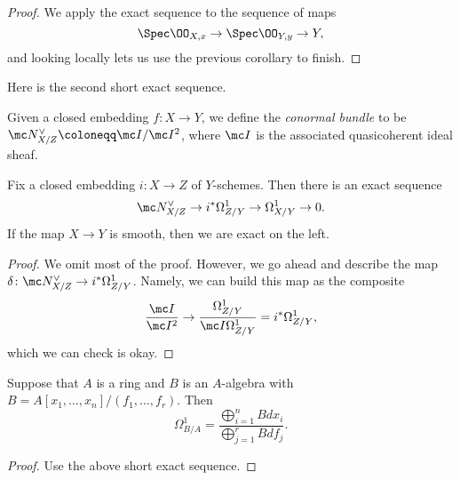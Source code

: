 \documentclass[../notes.tex]{subfiles}
\begin{document}
\begin{proof}
	We apply the exact sequence to the sequence of maps
	\[\Spec\OO_{X,x}\to\Spec\OO_{Y,y}\to Y,\]
	and looking locally lets us use the previous corollary to finish.
\end{proof}
Here is the second short exact sequence.
\begin{definition}
	Given a closed embedding $f\colon X\to Y$, we define the \textit{conormal bundle} to be $\mc N_{X/Z}^\lor\coloneqq\mc I/\mc I^2$, where $\mc I$ is the associated quasicoherent ideal sheaf.
\end{definition}
\begin{proposition}
	Fix a closed embedding $i\colon X\to Z$ of $Y$-schemes. Then there is an exact sequence
	\[\mc N_{X/Z}^\lor\to i^*\Omega^1_{Z/Y}\to\Omega^1_{X/Y}\to0.\]
	If the map $X\to Y$ is smooth, then we are exact on the left.
\end{proposition}
\begin{proof}
	We omit most of the proof. However, we go ahead and describe the map $\delta\colon\mc N_{X/Z}^\lor\to i^*\Omega^1_{Z/Y}$. Namely, we can build this map as the composite
	\[\frac{\mc I}{\mc I^2}\to\frac{\Omega^1_{Z/Y}}{\mc I\Omega^1_{Z/Y}}=i^*\Omega^1_{Z/Y},\]
	which we can check is okay.
\end{proof}
\begin{corollary}
	Suppose that $A$ is a ring and $B$ is an $A$-algebra with $B=A[x_1,\ldots,x_n]/(f_1,\ldots,f_r)$. Then
	\[\Omega^1_{B/A}=\frac{\bigoplus_{i=1}^nBdx_i}{\bigoplus_{j=1}^rBdf_j}.\]
\end{corollary}
\begin{proof}
	Use the above short exact sequence.
\end{proof}
\end{document}
